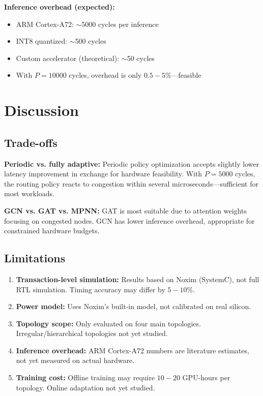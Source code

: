 \documentclass[conference]{IEEEtran}
\begin{document}
\textbf{Inference overhead (expected):}
\begin{itemize}
 \item ARM Cortex-A72: $\sim$5000 cycles per inference
 \item INT8 quantized: $\sim$500 cycles
 \item Custom accelerator (theoretical): $\sim$50 cycles
 \item With $P=10000$ cycles, overhead is only $0.5{-}5\%$---feasible
\end{itemize}

\section{Discussion}
\label{sec:discussion}

\subsection{Trade-offs}

\textbf{Periodic vs. fully adaptive:} Periodic policy optimization accepts slightly lower latency improvement in exchange for hardware feasibility. With $P=5000$ cycles, the routing policy reacts to congestion within several microseconds---sufficient for most workloads.

\textbf{GCN vs. GAT vs. MPNN:} GAT is most suitable due to attention weights focusing on congested nodes. GCN has lower inference overhead, appropriate for constrained hardware budgets.

\subsection{Limitations}
\label{sec:limitations}

\begin{enumerate}
 \item \textbf{Transaction-level simulation:} Results based on Noxim (SystemC), not full RTL simulation. Timing accuracy may differ by $5{-}10\%$.
 \item \textbf{Power model:} Uses Noxim's built-in model, not calibrated on real silicon.
 \item \textbf{Topology scope:} Only evaluated on four main topologies. Irregular/hierarchical topologies not yet studied.
 \item \textbf{Inference overhead:} ARM Cortex-A72 numbers are literature estimates, not yet measured on actual hardware.
 \item \textbf{Training cost:} Offline training may require $10{-}20$ GPU-hours per topology. Online adaptation not yet studied.
\end{enumerate}
\end{document}
